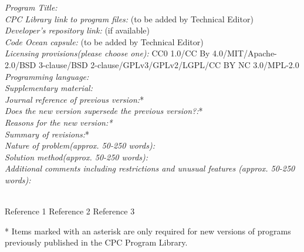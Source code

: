 \documentclass[preprint,12pt]{elsarticle}
\begin{document}
\begin{small}
\noindent
{\em Program Title:}                                          \\
{\em CPC Library link to program files:} (to be added by Technical Editor) \\
{\em Developer's repository link:} (if available) \\
{\em Code Ocean capsule:} (to be added by Technical Editor)\\
{\em Licensing provisions(please choose one):} CC0 1.0/CC By 4.0/MIT/Apache-2.0/BSD 3-clause/BSD 2-clause/GPLv3/GPLv2/LGPL/CC BY NC 3.0/MPL-2.0  \\
{\em Programming language:}                                   \\
{\em Supplementary material:}                                 \\
{\em Journal reference of previous version:}*                  \\
{\em Does the new version supersede the previous version?:}*   \\
{\em Reasons for the new version:*}\\
{\em Summary of revisions:}*\\
{\em Nature of problem(approx. 50-250 words):}\\
{\em Solution method(approx. 50-250 words):}\\
{\em Additional comments including restrictions and unusual features (approx. 50-250 words):}\\
   \\

\begin{thebibliography}{0}
Reference 1         %
Reference 2         %
Reference 3         %
\end{thebibliography}
* Items marked with an asterisk are only required for new versions
of programs previously published in the CPC Program Library.\\
\end{small}
\end{document}
